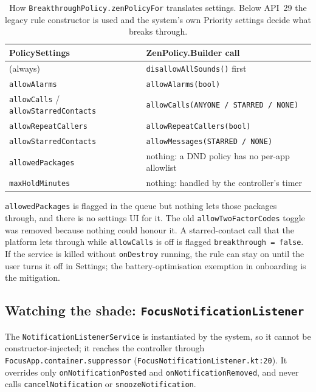 \documentclass[10pt,a4paper]{article}
\newcommand{\file}[1]{\texttt{\small #1}}          %
\newcommand{\code}[1]{\texttt{#1}}                  %
\begin{document}
\begin{table}[htbp]\centering\small
\begin{tabular}{@{}l l@{}}
\toprule
\textbf{PolicySettings} & \textbf{ZenPolicy.Builder call} \\
\midrule
(always) & \code{disallowAllSounds()} first \\
\code{allowAlarms} & \code{allowAlarms(bool)} \\
\code{allowCalls} / \code{allowStarredContacts} & \code{allowCalls(ANYONE / STARRED / NONE)} \\
\code{allowRepeatCallers} & \code{allowRepeatCallers(bool)} \\
\code{allowStarredContacts} & \code{allowMessages(STARRED / NONE)} \\
\code{allowedPackages} & nothing: a DND policy has no per-app allowlist \\
\code{maxHoldMinutes} & nothing: handled by the controller's timer \\
\bottomrule
\end{tabular}
\caption{How \code{BreakthroughPolicy.zenPolicyFor} translates settings. Below API~29 the legacy
rule constructor is used and the system's own Priority settings decide what breaks through.}
\label{tab:zen}
\end{table}

\begin{gotcha}
\code{allowedPackages} is flagged in the queue but nothing lets those packages through, and there
is no settings UI for it. The old \code{allowTwoFactorCodes} toggle was removed because nothing
could honour it. A starred-contact call that the platform lets through while \code{allowCalls} is
off is flagged \code{breakthrough = false}. If the service is killed without \code{onDestroy}
running, the rule can stay on until the user turns it off in Settings; the battery-optimisation
exemption in onboarding is the mitigation.
\end{gotcha}

\subsection{Watching the shade: \code{FocusNotificationListener}}

The \code{NotificationListenerService} is instantiated by the system, so it cannot be
constructor-injected; it reaches the controller through \code{FocusApp.container.suppressor}
(\file{FocusNotificationListener.kt:20}). It overrides only \code{onNotificationPosted} and
\code{onNotificationRemoved}, and never calls \code{cancelNotification} or
\code{snoozeNotification}.
\end{document}
